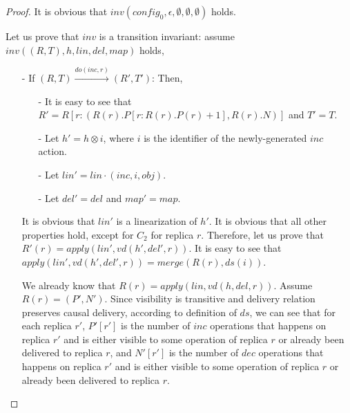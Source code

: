 \begin {proof}

It is obvious that $\mathit{inv}(\mathit{config}_0,\epsilon,\emptyset,\emptyset,\emptyset)$ holds.

Let us prove that $\mathit{inv}$ is a transition invariant: assume $\mathit{inv}((R,T),h,\mathit{lin},\mathit{del},\mathit{map})$ holds,

\begin{itemize}
\setlength{\itemsep}{0.5pt}
\item[-] If $(R,T) {\xrightarrow{\mathit{do}(\mathit{inc},r)}} (R',T')$: Then, 

    \begin{itemize}
    \setlength{\itemsep}{0.5pt}
    \item[-] It is easy to see that $R' = R[ r: ( R(r).P[r: R(r).P(r)+1 ], R(r).N ) ]$ and $T' = T$. 
    
    \item[-] Let $h' = h \otimes i$, where $i$ is the identifier of the newly-generated $\mathit{inc}$ action. 
    
    \item[-] Let $\mathit{lin}' = \mathit{lin} \cdot (\mathit{inc},i,\mathit{obj})$.  
    
    \item[-] Let $\mathit{del}' = \mathit{del}$ and $\mathit{map}' = \mathit{map}$. 
    \end{itemize} 
    
    It is obvious that $\mathit{lin}'$ is a linearization of $h'$. It is obvious that all other properties hold, except for $C_2$ for replica $r$. Therefore, let us prove that $R'(r) = \mathit{apply}(\mathit{lin}',\mathit{vd}(h',\mathit{del}',r))$. It is easy to see that $\mathit{apply}(\mathit{lin}',\mathit{vd}(h',\mathit{del}',r)) = \mathit{merge}(R(r),\mathit{ds}(i))$.
    
    We already know that $R(r) = \mathit{apply}(\mathit{lin},\mathit{vd}(h,\mathit{del},r))$. Assume $R(r)=(P',N')$. Since visibility is transitive and delivery relation preserves causal delivery, according to definition of $\mathit{ds}$, we can see that for each replica $r'$, $P'[r']$ is the number of $\mathit{inc}$ operations that happens on replica $r'$ and is either visible to some operation of replica $r$ or already been delivered to replica $r$, and $N'[r']$ is the number of $\mathit{dec}$ operations that happens on replica $r'$ and is either visible to some operation of replica $r$ or already been delivered to replica $r$. 


\end{itemize}
\end{proof}
